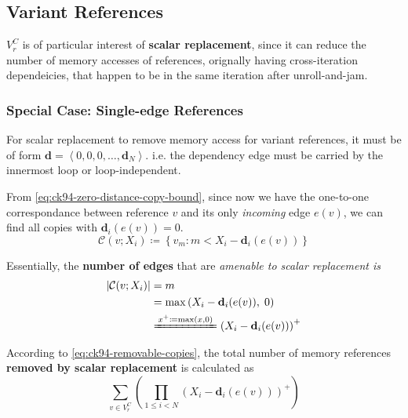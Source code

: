 \subsection{Variant References}
$V^{C}_{r}$ is of particular interest of \textbf{scalar replacement},
since it can reduce the number of memory accesses of references,
orignally having cross-iteration  dependeicies,
that happen to be in the same iteration after unroll-and-jam.

\subsubsection{Special Case: Single-edge References}
For scalar replacement to remove memory access for variant references, it must
be of form $\mathbf{d} = \left\langle 0, 0, 0, \dots, \mathbf{d}_{N} \right\rangle$. i.e. the
dependency edge must be carried by the innermost loop or loop-independent.

From \cref{eq:ck94-zero-distance-copy-bound}, since now we have the one-to-one
correspondance between reference $v$ and its only \textit{incoming} edge $e(v)$,
we can find all copies with $\mathbf{d}_{i}(e(v)) = 0$.
\[
  \mathcal{C}(v; X_{i}) \coloneqq
  \left\{ v_{m}: m < X_{i} - \mathbf{d}_{i}(e(v)) \right\}
\]

Essentially, the \textbf{number of edges} that are \textit{amenable to scalar replacement
is}
\begin{equation}
  \begin{aligned}
    \left| \mathcal{C}(v; X_{i}) \right|
    &= m \\
    &= \max \left(X_{i} - \mathbf{d}_{i}(e(v)), \; 0 \right) \\
    &\xlongequal{x^{+} \coloneqq \max(x, 0)}
    \left(X_{i} - \mathbf{d}_{i}(e(v))\right)^{+}
  \end{aligned}
  \label{eq:ck94-removable-copies}
\end{equation}



According to \cref{eq:ck94-removable-copies}, the total number of
memory references \textbf{removed by scalar replacement} is calculated as
\begin{equation}
  \sum_{v \in V^{C}_{r}} \left(\prod_{1 \le i < N}
    \left(X_{i} - \mathbf{d}_{i}(e(v))\right)^{+}\right)
  \label{eq:ck94-removed-variant-references}
\end{equation}

